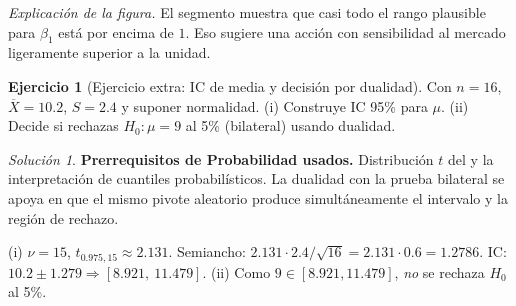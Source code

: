 \documentclass[11pt]{article}
\theoremstyle{plain}
\theoremstyle{definition}
\newtheorem{exercise}[theorem]{Ejercicio}
\theoremstyle{remark}
\theoremstyle{solstyle}
\newtheorem*{solution}{Solución}
\newcommand{\1}{\mathbbm{1}}
\newcommand{\Xbar}{\overline{X}}
\begin{document}
\begin{center}
\end{center}

\noindent\textit{Explicación de la figura.} El segmento muestra que casi todo el rango plausible para $\beta_1$ está por encima de $1$. Eso sugiere una acción con sensibilidad al mercado ligeramente superior a la unidad.

\begin{exercise}[Ejercicio extra: IC de media y decisión por dualidad]\label{ex:ex5}
Con $n=16$, $\Xbar=10.2$, $S=2.4$ y suponer normalidad.
(i) Construye IC 95\% para $\mu$.
(ii) Decide si rechazas $H_0:\mu=9$ al 5\% (bilateral) usando dualidad.
\end{exercise}

\begin{solution}
\textbf{Prerrequisitos de Probabilidad usados.}
Distribución $t$ del  y la interpretación de cuantiles probabilísticos.
La dualidad con la prueba bilateral se apoya en que el mismo pivote aleatorio produce simultáneamente
el intervalo y la región de rechazo.

(i) $\nu=15$, $t_{0.975,15}\approx 2.131$.
Semiancho: $2.131\cdot 2.4/\sqrt{16}=2.131\cdot 0.6=1.2786$.
IC: $10.2\pm 1.279\Rightarrow [8.921,\ 11.479]$.
(ii) Como $9\in[8.921,11.479]$, \emph{no} se rechaza $H_0$ al 5\%.
\end{solution}
\end{document}
